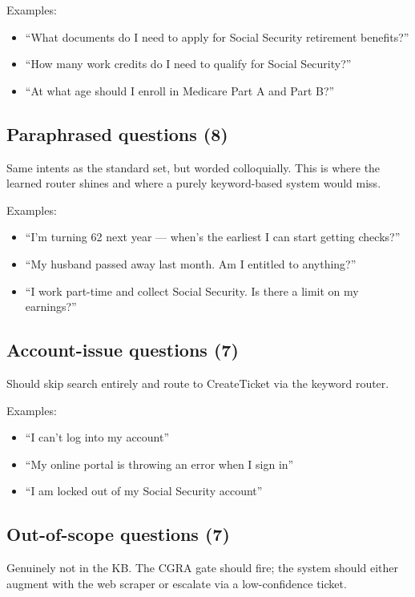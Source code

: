 \documentclass[11pt,a4paper]{article}
\begin{document}
Examples:
\begin{itemize}[leftmargin=*, itemsep=0.5pt]
\item ``What documents do I need to apply for Social Security retirement benefits?''
\item ``How many work credits do I need to qualify for Social Security?''
\item ``At what age should I enroll in Medicare Part A and Part B?''
\end{itemize}

\subsection{Paraphrased questions (8)}

Same intents as the standard set, but worded colloquially. This is where the learned router shines and where a purely keyword-based system would miss.

Examples:
\begin{itemize}[leftmargin=*, itemsep=0.5pt]
\item ``I'm turning 62 next year --- when's the earliest I can start getting checks?''
\item ``My husband passed away last month. Am I entitled to anything?''
\item ``I work part-time and collect Social Security. Is there a limit on my earnings?''
\end{itemize}

\subsection{Account-issue questions (7)}

Should skip search entirely and route to CreateTicket via the keyword router.

Examples:
\begin{itemize}[leftmargin=*, itemsep=0.5pt]
\item ``I can't log into my account''
\item ``My online portal is throwing an error when I sign in''
\item ``I am locked out of my Social Security account''
\end{itemize}

\subsection{Out-of-scope questions (7)}

Genuinely not in the KB. The CGRA gate should fire; the system should either augment with the web scraper or escalate via a low-confidence ticket.
\end{document}
